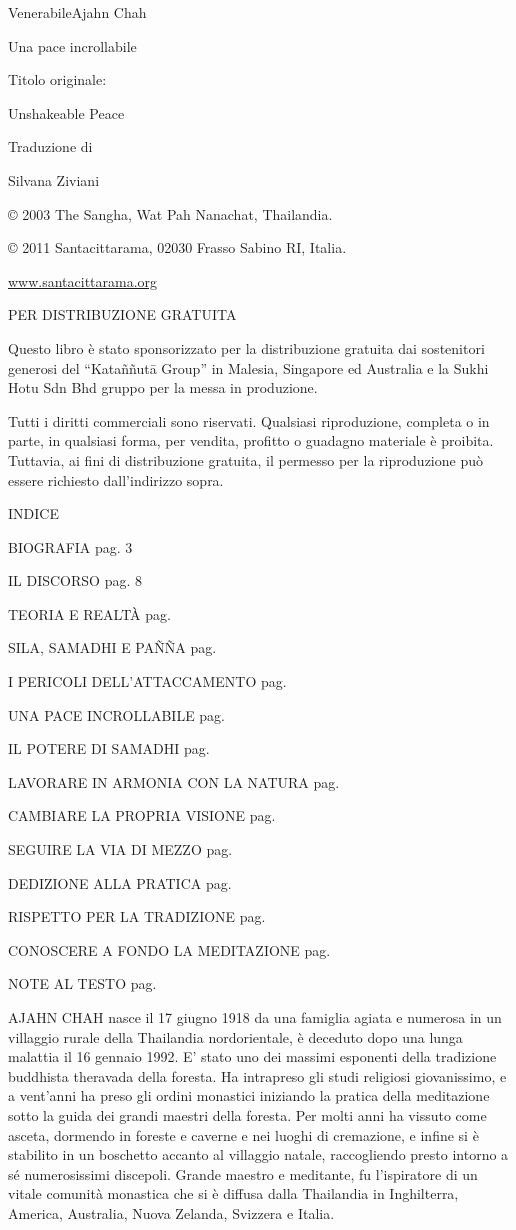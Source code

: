 VenerabileAjahn Chah

Una pace incrollabile

Titolo originale:

Unshakeable Peace

Traduzione di

Silvana Ziviani

© 2003 The Sangha, Wat Pah Nanachat, Thailandia.

© 2011 Santacittarama, 02030 Frasso Sabino RI, Italia.

\href{http://Www.santacittarama.org/}{www.santacittarama.org}

PER DISTRIBUZIONE GRATUITA

Questo libro è stato sponsorizzato per la distribuzione gratuita dai
sostenitori generosi del ``Kataññutā Group'' in Malesia, Singapore ed
Australia e la Sukhi Hotu Sdn Bhd gruppo per la messa in produzione.

Tutti i diritti commerciali sono riservati. Qualsiasi riproduzione,
completa o in parte, in qualsiasi forma, per vendita, profitto o
guadagno materiale è proibita. Tuttavia, ai fini di distribuzione
gratuita, il permesso per la riproduzione può essere richiesto
dall'indirizzo sopra.

INDICE

BIOGRAFIA pag. 3

IL DISCORSO pag. 8

TEORIA E REALTÀ pag.

SILA, SAMADHI E PAÑÑA pag.

I PERICOLI DELL'ATTACCAMENTO pag.

UNA PACE INCROLLABILE pag.

IL POTERE DI SAMADHI pag.

LAVORARE IN ARMONIA CON LA NATURA pag.

CAMBIARE LA PROPRIA VISIONE pag.

SEGUIRE LA VIA DI MEZZO pag.

DEDIZIONE ALLA PRATICA pag.

RISPETTO PER LA TRADIZIONE pag.

CONOSCERE A FONDO LA MEDITAZIONE pag.

NOTE AL TESTO pag.

AJAHN CHAH nasce il 17 giugno 1918 da una famiglia agiata e numerosa in
un villaggio rurale della Thailandia nordorientale, è deceduto dopo una
lunga malattia il 16 gennaio 1992. E' stato uno dei massimi esponenti
della tradizione buddhista theravada della foresta. Ha intrapreso gli
studi religiosi giovanissimo, e a vent'anni ha preso gli ordini
monastici iniziando la pratica della meditazione sotto la guida dei
grandi maestri della foresta. Per molti anni ha vissuto come asceta,
dormendo in foreste e caverne e nei luoghi di cremazione, e infine si è
stabilito in un boschetto accanto al villaggio natale, raccogliendo
presto intorno a sé numerosissimi discepoli. Grande maestro e meditante,
fu l'ispiratore di un vitale comunità monastica che si è diffusa dalla
Thailandia in Inghilterra, America, Australia, Nuova Zelanda, Svizzera e
Italia.

